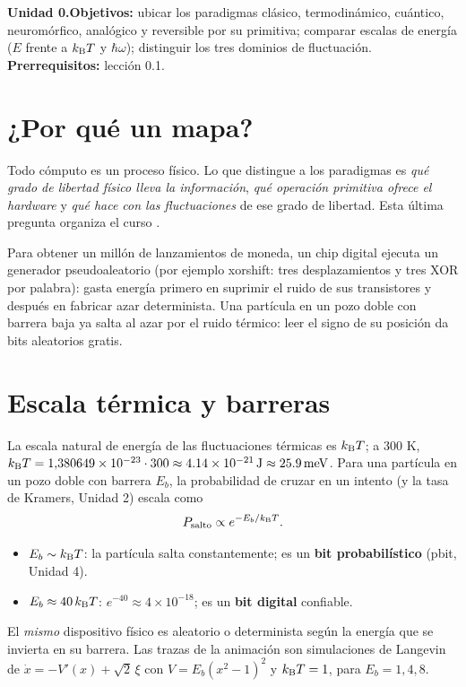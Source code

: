 \documentclass[11pt,a4paper]{article}
\begin{document}

\noindent\textbf{Unidad 0.}\quad \textbf{Objetivos:} ubicar los paradigmas clásico, termodinámico, cuántico,
neuromórfico, analógico y reversible por su primitiva; comparar escalas de energía ($E$ frente a $k_{\mathrm B} T$ y
$\hbar\omega$); distinguir los tres dominios de fluctuación. \textbf{Prerrequisitos:} lección 0.1.

\section{¿Por qué un mapa?}
Todo cómputo es un proceso físico. Lo que distingue a los paradigmas es \emph{qué grado de libertad físico
lleva la información}, \emph{qué operación primitiva ofrece el hardware} y \emph{qué hace con las
fluctuaciones} de ese grado de libertad. Esta última pregunta organiza el curso \cite{conte,coles}.

\begin{intuicion}
Para obtener un millón de lanzamientos de moneda, un chip digital ejecuta un generador pseudoaleatorio
(por ejemplo xorshift: tres desplazamientos y tres XOR por palabra): gasta energía primero en suprimir el
ruido de sus transistores y después en fabricar azar determinista. Una partícula en un pozo doble con
barrera baja ya salta al azar por el ruido térmico: leer el signo de su posición da bits aleatorios gratis.
\end{intuicion}

\section{Escala térmica y barreras}
La escala natural de energía de las fluctuaciones térmicas es $k_{\mathrm B} T$; a 300 K,
$k_{\mathrm B} T=1{,}380649\times10^{-23}\cdot300\approx\SI{4.14e-21}{J}\approx\SI{25.9}{meV}$.
Para una partícula en un pozo doble con barrera $E_b$, la probabilidad de cruzar en un intento (y la tasa de
Kramers, Unidad 2) escala como
\begin{equation}P_{\text{salto}}\propto e^{-E_b/k_{\mathrm B} T}.\end{equation}
\begin{itemize}[nosep]
\item $E_b\sim k_{\mathrm B} T$: la partícula salta constantemente; es un \textbf{bit probabilístico} (pbit, Unidad 4).
\item $E_b\approx40\,k_{\mathrm B} T$: $e^{-40}\approx4\times10^{-18}$; es un \textbf{bit digital} confiable.
\end{itemize}
El \emph{mismo} dispositivo físico es aleatorio o determinista según la energía que se invierta en su barrera.
Las trazas de la animación son simulaciones de Langevin \evS{} de $\dot x=-V'(x)+\sqrt2\,\xi$ con
$V=E_b(x^2-1)^2$ y $k_{\mathrm B} T=1$, para $E_b=1,4,8$.
\end{document}
